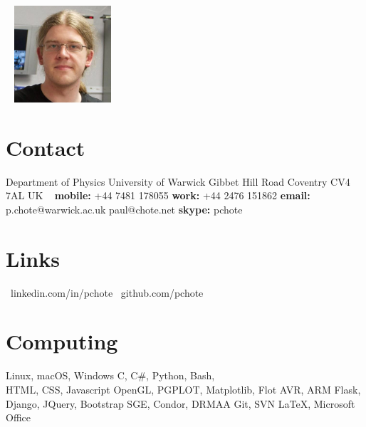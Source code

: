 \documentclass[print]{cv-style}
\begin{document}

\begin{aside}
\vspace{0.35cm}~
\includegraphics[width=3.6cm]{CV_Photo.jpg}
~
\section{Contact}
Department of Physics
University of Warwick
Gibbet Hill Road
Coventry
CV4 7AL
UK
~
{\bf mobile:} 
+44 7481 178055
{\bf work:} 
+44 2476 151862
{\bf email:}
{\small p.chote@warwick.ac.uk}
{\small paul@chote.net}
{\bf skype:}
{\small pchote}
~
\section{Links}
{\small \faLinkedin~linkedin.com/in/pchote}
{\small \faGithub~github.com/pchote}
~
\section{Computing}
\vspace{1mm}{\bf Operating systems:} 
{\small Linux, macOS, Windows}
\vspace{1mm}{\bf Programming Languages:} 
{\small C, C\#, Python, Bash,\\HTML, CSS, Javascript}
\vspace{1mm}{\bf Display APIs:} 
{\small OpenGL, PGPLOT, Matplotlib, Flot}
\vspace{1mm}{\bf Embedded Systems:}
{\small AVR, ARM}
\vspace{1mm}{\bf Web Frameworks:}
{\small Flask, Django, JQuery, Bootstrap}
\vspace{1mm}{\bf Grid Computing:} 
{\small SGE, Condor, DRMAA}
\vspace{1mm}{\bf Version Control:} 
{\small Git, SVN}
\vspace{1mm}{\bf Word Processing:} 
{\small \LaTeX, Microsoft Office}
~
\end{aside}

\vspace{0.5cm}
\end{document}
